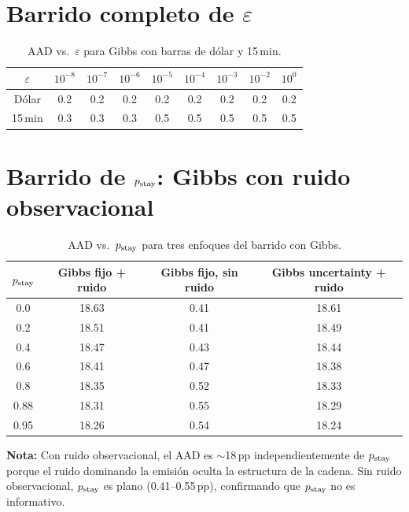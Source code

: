 \section{Barrido completo de $\varepsilon$}

\begin{table}[h]
\centering
\caption{AAD vs.\ $\varepsilon$ para Gibbs con barras de d\'{o}lar y 15\,min.}
\begin{tabular}{ccccccccc}
\toprule
$\varepsilon$ & $10^{-8}$ & $10^{-7}$ & $10^{-6}$ & $10^{-5}$ & $10^{-4}$ & $10^{-3}$ & $10^{-2}$ & $10^{0}$ \\
\midrule
D\'{o}lar & 0.2 & 0.2 & 0.2 & 0.2 & 0.2 & 0.2 & 0.2 & 0.2 \\
15\,min & 0.3 & 0.3 & 0.3 & 0.5 & 0.5 & 0.5 & 0.5 & 0.5 \\
\bottomrule
\end{tabular}
\end{table}

\section{Barrido de $p_{\text{stay}}$: Gibbs con ruido observacional}

\begin{table}[h]
\centering
\caption{AAD vs.\ $p_{\text{stay}}$ para tres enfoques del barrido con Gibbs.}
\begin{tabular}{cccc}
\toprule
$p_{\text{stay}}$ & Gibbs fijo + ruido & Gibbs fijo, sin ruido & Gibbs uncertainty + ruido \\
\midrule
0.0 & 18.63 & 0.41 & 18.61 \\
0.2 & 18.51 & 0.41 & 18.49 \\
0.4 & 18.47 & 0.43 & 18.44 \\
0.6 & 18.41 & 0.47 & 18.38 \\
0.8 & 18.35 & 0.52 & 18.33 \\
0.88 & 18.31 & 0.55 & 18.29 \\
0.95 & 18.26 & 0.54 & 18.24 \\
\bottomrule
\end{tabular}
\end{table}

\textbf{Nota:} Con ruido observacional, el AAD es $\sim$18\,pp independientemente
de $p_{\text{stay}}$ porque el ruido dominando la emisi\'{o}n oculta la estructura de la
cadena. Sin ruido observacional, $p_{\text{stay}}$ es plano (0.41--0.55\,pp), confirmando
que $p_{\text{stay}}$ no es informativo.